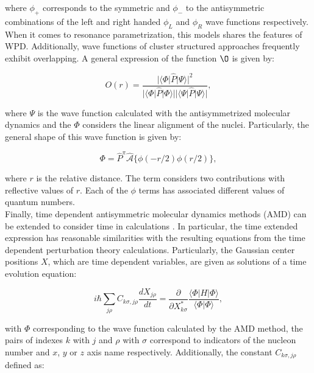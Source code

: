 \documentclass[openany]{book}
\begin{document}
where $\phi_+$ corresponds to the symmetric and $\phi_-$ to the antisymmetric combinations of the left and right handed $\phi_L$ and $\phi_R$ wave functions respectively.  \\

When it comes to resonance parametrization, this models shares the features of WPD. Additionally, wave functions of cluster structured approaches frequently exhibit overlapping. A general expression of the function $\O $ is given by:  

\begin{equation}\label{eq:micro_linearChain_overlapping}
	O(r) = \frac{|\langle \Phi | \hat P | \Psi \rangle |^2}{|\langle \Phi | \hat P | \Phi \rangle | |\langle \Psi | \hat P | \Psi \rangle |},
\end{equation} 

where $\Psi$ is the wave function calculated with the antisymmetrized molecular dynamics and the $\Phi$ considers the linear alignment of the nuclei. Particularly, the general shape of this wave function is given by: 

\begin{equation}\label{eq:micro_linearChain_chainWaveFunction}
	\Phi = \hat P^{\pi} \hat {\mathcal{A}}   \{ {\phi (-r/2)  \phi (r/2) } \},
\end{equation} 

where $r$ is the relative distance. The term considers two contributions with reflective values of $r$. Each of the $\phi$ terms has associated different values of quantum numbers. \\

Finally, time dependent antisymmetric molecular dynamics methods (AMD) can be extended to consider time in calculations \cite{freer_horiuchi_kanada-enyo_lee_meisner_2018}. In particular, the time extended expression has reasonable similarities with the resulting equations from the time dependent perturbation theory calculations. Particularly, the Gaussian center positions $X$, which are time dependent variables, are given as solutions of a time evolution equation:

\begin{equation}\label{eq:micro_AMD_timeDependent}
	i \hbar \sum_{j\rho} C_{k\sigma, j\rho} \frac{dX_{j\rho}}{dt} = \frac{\partial}{\partial X_{k\sigma}^{*}} \frac{\langle \Phi | H | \Phi \rangle }{\langle \Phi | \Phi \rangle},
\end{equation}

with $\Phi$ corresponding to the wave function calculated by the AMD method, the pairs of indexes $k$ with $j$ and $\rho$ with $\sigma$ correspond to indicators of the nucleon number and $x$, $y$ or $z$ axis name respectively. Additionally, the constant $C_{k\sigma, j\rho}$ defined as: 
\end{document}
